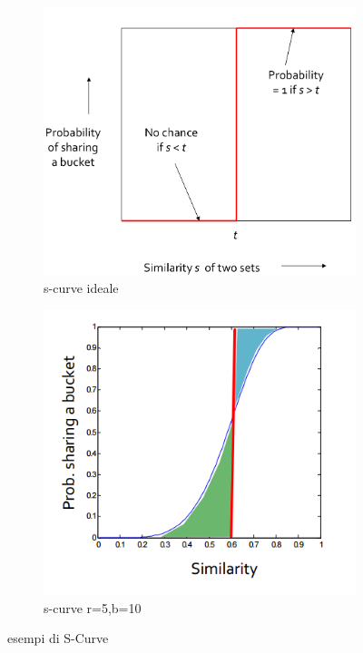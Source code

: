\documentclass[a4paper,12pt]{report}
\begin{document}
\begin{figure}
    \centering
    \begin{subfigure}[b]{0.45\textwidth}
        \centering
        \includegraphics[width=\textwidth]{perfectSCURVE}
        \caption{s-curve ideale}
        \label{fig:perfectScurve}
    \end{subfigure}
    \hfill
    \begin{subfigure}[b]{0.45\textwidth}
        \centering
        \includegraphics[width=\textwidth]{s-curve}
       \caption{s-curve r=5,b=10}
        \label{fig:realscurve}
    \end{subfigure}
    \hfill
    
    \caption{esempi di S-Curve}
    \label{fig:scurve}
\end{figure} 
\end{document}
